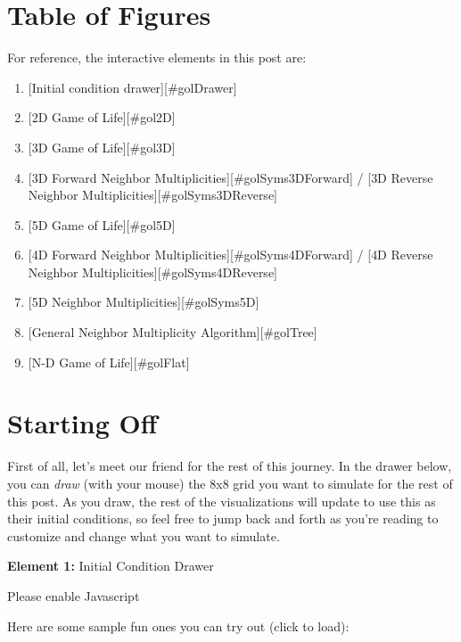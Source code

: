 \documentclass[]{article}
\begin{document}
\hypertarget{table-of-figures}{%
\section{Table of Figures}\label{table-of-figures}}

For reference, the interactive elements in this post are:

\begin{enumerate}
\def\labelenumi{\arabic{enumi}.}
\tightlist
\item
  {[}Initial condition drawer{]}{[}\#golDrawer{]}
\item
  {[}2D Game of Life{]}{[}\#gol2D{]}
\item
  {[}3D Game of Life{]}{[}\#gol3D{]}
\item
  {[}3D Forward Neighbor Multiplicities{]}{[}\#golSyms3DForward{]} / {[}3D
  Reverse Neighbor Multiplicities{]}{[}\#golSyms3DReverse{]}
\item
  {[}5D Game of Life{]}{[}\#gol5D{]}
\item
  {[}4D Forward Neighbor Multiplicities{]}{[}\#golSyms4DForward{]} / {[}4D
  Reverse Neighbor Multiplicities{]}{[}\#golSyms4DReverse{]}
\item
  {[}5D Neighbor Multiplicities{]}{[}\#golSyms5D{]}
\item
  {[}General Neighbor Multiplicity Algorithm{]}{[}\#golTree{]}
\item
  {[}N-D Game of Life{]}{[}\#golFlat{]}
\end{enumerate}

\hypertarget{starting-off}{%
\section{Starting Off}\label{starting-off}}

First of all, let's meet our friend for the rest of this journey. In the drawer
below, you can \emph{draw} (with your mouse) the 8x8 grid you want to simulate
for the rest of this post. As you draw, the rest of the visualizations will
update to use this as their initial conditions, so feel free to jump back and
forth as you're reading to customize and change what you want to simulate.

\leavevmode\hypertarget{golDrawer}{}%
\textbf{Element 1:} Initial Condition Drawer

\leavevmode\hypertarget{golDrawerCont}{}%
Please enable Javascript

Here are some sample fun ones you can try out (click to load):
\end{document}
